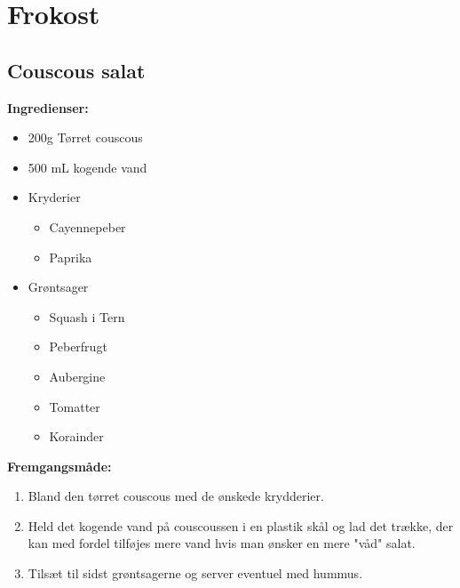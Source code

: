 \documentclass{book}
\begin{document}
\chapter{Frokost}
\minitoc
\clearpage \section{Couscous salat}
\begin{minipage}[t]{0.5\textwidth}
\textbf{Ingredienser:}
\begin{itemize}
    \item 200g Tørret couscous
    \item 500 mL kogende vand
    \item Kryderier
    \begin{itemize}
        \item Cayennepeber
        \item Paprika
    \end{itemize}
    \item Grøntsager
    \begin{itemize}
        \item Squash i Tern
        \item Peberfrugt
        \item Aubergine
        \item Tomatter
        \item Korainder
    \end{itemize}
\end{itemize}
\end{minipage}
\begin{minipage}[t]{0.5\textwidth}
\textbf{Fremgangsmåde:}
\begin{enumerate}
    \item Bland den tørret couscous med de ønskede krydderier. 
    \item Held det kogende vand på couscoussen i en plastik skål og lad det trække, der kan med fordel tilføjes mere vand hvis man ønsker en mere "våd" salat.
    \item Tilsæt til sidst grøntsagerne og server eventuel med hummus.
\end{enumerate}
\end{minipage}
\newpage
\end{document}
